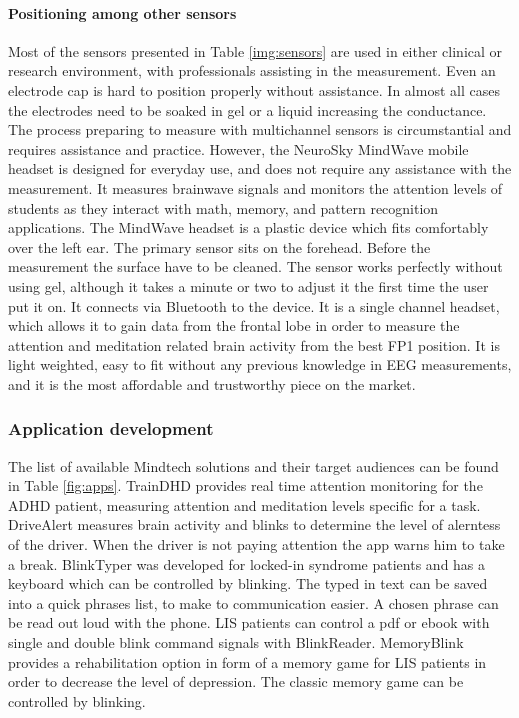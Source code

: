\documentclass[letterpaper,10pt]{article}
\begin{document}
\paragraph{Positioning among other sensors}

Most of the sensors presented in Table \ref{img:sensors} are used in either clinical or research environment, with professionals assisting in the measurement. Even an electrode cap is hard to position properly without assistance. In almost all cases the electrodes need to be soaked in gel or a liquid increasing the conductance. The process preparing to measure with multichannel sensors is circumstantial and requires assistance and practice.
However, the NeuroSky MindWave mobile headset is designed for everyday use, and does not require any assistance with the measurement. It measures brainwave signals and monitors the attention levels of students as they interact with math, memory, and pattern recognition applications. The MindWave headset is a plastic device which fits comfortably over the left ear. The primary sensor sits on the forehead. Before the measurement the surface have to be cleaned. The sensor works perfectly without using gel, although it takes a minute or two to adjust it the first time the user put it on. It connects via Bluetooth to the device. \cite{wearable}
It is a single channel headset, which allows it to gain data from the frontal lobe in order to measure the attention and meditation related brain activity from the best FP1 position. It is light weighted, easy to fit without any previous knowledge in EEG measurements, and it is the most affordable and trustworthy piece on the market.



\subsubsection{Application development}

The list of available Mindtech solutions and their target audiences can be found in Table \ref{fig:apps}. TrainDHD provides real time attention monitoring for the ADHD patient, measuring attention and meditation levels specific for a task. DriveAlert measures brain activity and  blinks to determine the level of alerntess of the driver. When the driver is not paying attention the app warns him to take a break. BlinkTyper was developed for locked-in syndrome patients and has a keyboard which can be controlled by blinking. The typed in text can be saved into a quick phrases list, to make to communication easier. A chosen phrase can be read out loud with the phone. LIS patients can control a pdf or ebook with single and double blink command signals with BlinkReader. MemoryBlink provides a rehabilitation option in form of a memory game for LIS patients in order to decrease the level of depression. The classic memory game can be controlled by blinking.
\end{document}
